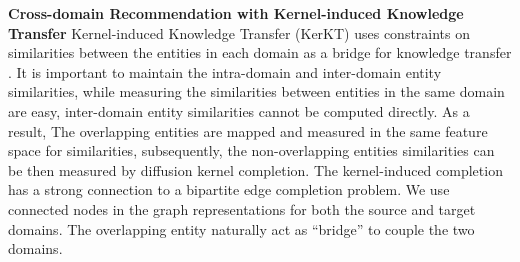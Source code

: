 \bigskip
\textbf{Cross-domain Recommendation with Kernel-induced Knowledge Transfer}
Kernel-induced Knowledge Transfer (KerKT) uses constraints on similarities between the entities in each domain as a bridge for knowledge transfer \citep{zhang2018cross}. It is important to maintain the intra-domain and inter-domain entity similarities, while measuring the similarities between entities in the same domain are easy, inter-domain entity similarities cannot be computed directly.  
As a result, The overlapping entities are mapped and measured in the same feature space for similarities, subsequently, the non-overlapping entities similarities can be then measured by diffusion kernel completion.
The kernel-induced completion has a strong connection to a bipartite edge completion problem\citep{he2016birank}. We use connected nodes in the graph representations for both the source and target domains. The overlapping entity naturally act as “bridge” to couple the two domains.


